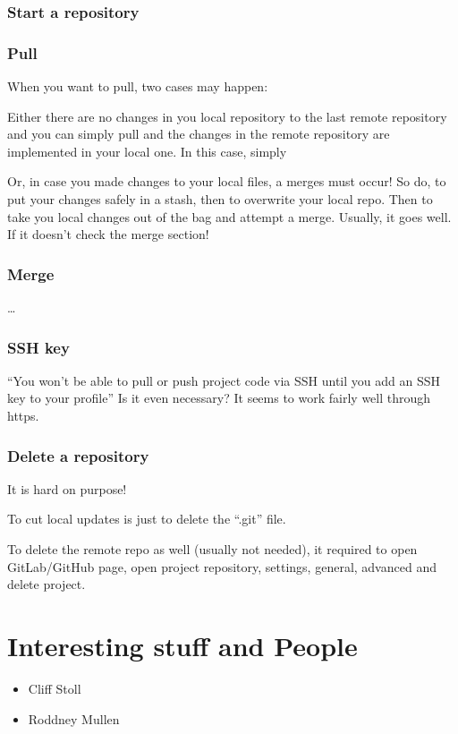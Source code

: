 \subsubsection{Start a repository}



\subsubsection{Pull}
When you want to pull, two cases may happen: 

Either there are no changes in you local repository to the last remote repository and you can simply pull and the changes in the remote repository are implemented in your local one. In this case, simply 

Or, in case you made changes to your local files, a merges must occur!
So do,  to put your changes safely in a stash, then  to overwrite your local repo. Then  to take you local changes out of the bag and attempt a merge. Usually, it goes well. If it doesn't check the merge section!

\subsubsection{Merge}
\dots

\subsubsection{SSH key}
``You won't be able to pull or push project code via SSH until you add an SSH key to your profile''
Is it even necessary? It seems to work fairly well through https.


\subsubsection{Delete a repository}
It is hard on purpose! 

To cut local updates is just to delete the ``.git'' file.

To delete the remote repo as well (usually not needed), it required to open GitLab/GitHub page, open project repository, settings, general, advanced and delete project.



\section{Interesting stuff and People}
\begin{itemize}
    \item Cliff Stoll
    \item Roddney Mullen
\end{itemize}
